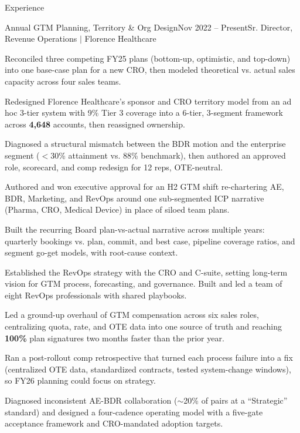 \documentclass{resume}
\begin{document}
\begin{rSection}{Experience}

\begin{rSubsection}{Annual GTM Planning, Territory \& Org Design}{\textcolor{black!60}{Nov 2022 -- Present}}{Sr. Director, Revenue Operations $\vert$ Florence Healthcare}{}
\item Reconciled three competing FY25 plans (bottom-up, optimistic, and top-down) into one base-case plan for a new CRO, then modeled theoretical vs. actual sales capacity across four sales teams.
\item Redesigned Florence Healthcare's sponsor and CRO territory model from an ad hoc 3-tier system with 9\% Tier 3 coverage into a 6-tier, 3-segment framework across \textbf{4,648} accounts, then reassigned ownership.
\item Diagnosed a structural mismatch between the BDR motion and the enterprise segment ($<$30\% attainment vs. 88\% benchmark), then authored an approved role, scorecard, and comp redesign for 12 reps, OTE-neutral.
\item Authored and won executive approval for an H2 GTM shift re-chartering AE, BDR, Marketing, and RevOps around one sub-segmented ICP narrative (Pharma, CRO, Medical Device) in place of siloed team plans.
\item Built the recurring Board plan-vs-actual narrative across multiple years: quarterly bookings vs. plan, commit, and best case, pipeline coverage ratios, and segment go-get models, with root-cause context.
\item Established the RevOps strategy with the CRO and C-suite, setting long-term vision for GTM process, forecasting, and governance. Built and led a team of eight RevOps professionals with shared playbooks.
\item Led a ground-up overhaul of GTM compensation across six sales roles, centralizing quota, rate, and OTE data into one source of truth and reaching \textbf{100\%} plan signatures two months faster than the prior year.
\item Ran a post-rollout comp retrospective that turned each process failure into a fix (centralized OTE data, standardized contracts, tested system-change windows), so FY26 planning could focus on strategy.
\item Diagnosed inconsistent AE-BDR collaboration ($\sim$20\% of pairs at a ``Strategic'' standard) and designed a four-cadence operating model with a five-gate acceptance framework and CRO-mandated adoption targets.

\end{rSubsection}
\end{rSection}
\end{document}
